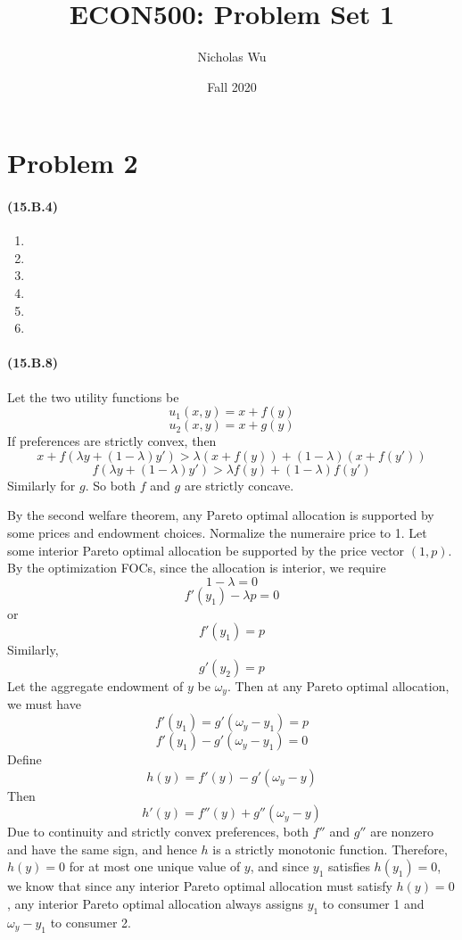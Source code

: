 \documentclass[10pt,letter]{article}
\begin{document}


\title{ECON500: Problem Set 1}

\author{Nicholas Wu}

\date{Fall 2020}

\maketitle


\section*{Problem 2}
\paragraph{(15.B.4)}
\begin{enumerate}[label=(\alph*)]
\item 
\item
\item
\item
\item
\item
\end{enumerate}
\paragraph{(15.B.8)} Let the two utility functions be
\[ u_1(x,y) = x + f(y) \]
\[ u_2(x,y) = x + g(y) \]
If preferences are strictly convex, then
\[  x +  f(\lambda y + (1-\lambda)y')  > \lambda (x+f(y)) + (1-\lambda)(x + f(y')) \]
\[ f(\lambda y + (1-\lambda)y')> \lambda f(y) + (1-\lambda) f(y')  \]
Similarly for $g$. So both $f$ and $g$ are strictly concave.

By the second welfare theorem, any Pareto optimal allocation is supported by some prices and endowment choices. Normalize the numeraire price to 1. Let some interior Pareto optimal allocation be supported by the price vector $(1, p)$. By the optimization FOCs, since the allocation is interior, we require
\[ 1 - \lambda = 0 \]
\[ f'(y_1) - \lambda p =0 \]
or
\[ f'(y_1) = p \]
Similarly,
\[ g'(y_2) = p \]
Let the aggregate endowment of $y$ be $\omega_y$. Then at any Pareto optimal allocation, we must have
\[ f'(y_1) = g'(\omega_y - y_1) = p \]
\[ f'(y_1) - g'(\omega_y - y_1) = 0 \]
Define
\[ h(y) = f'(y) - g'(\omega_y - y) \]
Then
\[ h'(y) = f''(y) + g''(\omega_y - y) \]
Due to continuity and strictly convex preferences, both $f''$ and $g''$ are nonzero and have the same sign, and hence $h$ is a strictly monotonic function. Therefore, $h(y) = 0$ for at most one unique value of $y$, and since $y_1$ satisfies $h(y_1) = 0$, we know that since any interior Pareto optimal allocation must satisfy $h(y) = 0$, any interior Pareto optimal allocation always assigns $y_1$ to consumer 1 and $\omega_y - y_1$ to consumer 2.
\end{document}

